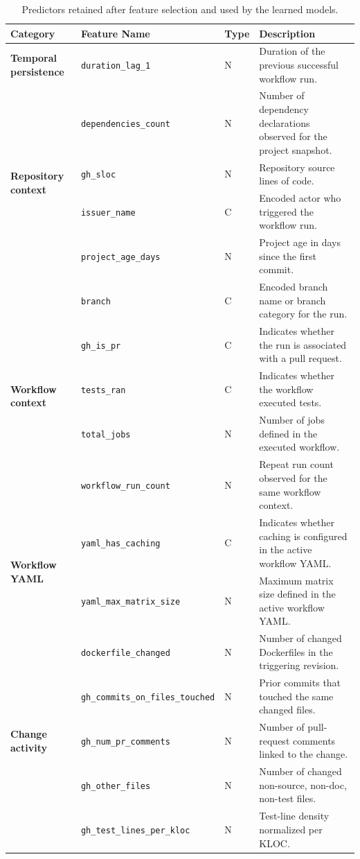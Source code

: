 \documentclass[conference]{IEEEconf}
\begin{document}
\begin{table}[!tp]
    \fontsize{6.5}{6.5}\selectfont
    \tabcolsep=0.1cm
\centering
\caption{Predictors retained after feature selection and used by the learned models.}
\label{tab:feature_summary_grouped}
\renewcommand{\arraystretch}{1.2}
\setlength{\tabcolsep}{4pt}
\begin{tabular}{p{2.6cm}p{5.3cm}p{0.8cm}p{7.2cm}}
\toprule
\textbf{Category} & \textbf{Feature Name} & \textbf{Type} & \textbf{Description} \\
\midrule
\multirow{1}{*}{\textbf{Temporal persistence}}
& \texttt{duration\_lag\_1} & N & Duration of the previous successful workflow run. \\
\midrule

\multirow{4}{*}{\textbf{Repository context}}
& \texttt{dependencies\_count} & N & Number of dependency declarations observed for the project snapshot. \\
& \texttt{gh\_sloc} & N & Repository source lines of code. \\
& \texttt{issuer\_name} & C & Encoded actor who triggered the workflow run. \\
& \texttt{project\_age\_days} & N & Project age in days since the first commit. \\
\midrule

\multirow{5}{*}{\textbf{Workflow context}}
& \texttt{branch} & C & Encoded branch name or branch category for the run. \\
& \texttt{gh\_is\_pr} & C & Indicates whether the run is associated with a pull request. \\
& \texttt{tests\_ran} & C & Indicates whether the workflow executed tests. \\
& \texttt{total\_jobs} & N & Number of jobs defined in the executed workflow. \\
& \texttt{workflow\_run\_count} & N & Repeat run count observed for the same workflow context. \\
\midrule

\multirow{2}{*}{\textbf{Workflow YAML}}
& \texttt{yaml\_has\_caching} & C & Indicates whether caching is configured in the active workflow YAML. \\
& \texttt{yaml\_max\_matrix\_size} & N & Maximum matrix size defined in the active workflow YAML. \\
\midrule

\multirow{5}{*}{\textbf{Change activity}}
& \texttt{dockerfile\_changed} & N & Number of changed Dockerfiles in the triggering revision. \\
& \texttt{gh\_commits\_on\_files\_touched} & N & Prior commits that touched the same changed files. \\
& \texttt{gh\_num\_pr\_comments} & N & Number of pull-request comments linked to the change. \\
& \texttt{gh\_other\_files} & N & Number of changed non-source, non-doc, non-test files. \\
& \texttt{gh\_test\_lines\_per\_kloc} & N & Test-line density normalized per KLOC. \\
\midrule


\end{tabular}
\end{table}
\end{document}
